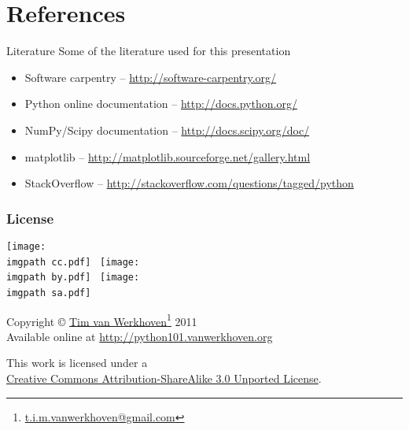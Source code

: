 \documentclass[xetex,10pt]{beamer}
\def\imgpath{../00-img/}
\def\spacer{\vspace*{1em}}
\begin{document}
\section*{References}

\begin{frame}{Literature}
	Some of the literature used for this presentation
	\spacer
	\begin{itemize}
		\item Software carpentry -- \url{http://software-carpentry.org/}
		\item Python online documentation -- \url{http://docs.python.org/}
		\pause
		\item NumPy/Scipy documentation -- \url{http://docs.scipy.org/doc/}
		\item matplotlib -- \url{http://matplotlib.sourceforge.net/gallery.html}
		\pause
		\item StackOverflow -- \url{http://stackoverflow.com/questions/tagged/python}
	\end{itemize}
	
\end{frame}

\begin{frame}
	\frametitle{License}

	\begin{center}
	\texttt{[image: \\imgpath cc.pdf]}~
	\texttt{[image: \\imgpath by.pdf]}~
	\texttt{[image: \\imgpath sa.pdf]}~
	
	\spacer

	Copyright © \href{http://work.vanwerkhoven.org/}{Tim van Werkhoven}\footnote[frame]{\url{t.i.m.vanwerkhoven@gmail.com}} 2011\\
	Available online at \url{http://python101.vanwerkhoven.org}
	
	\spacer

	This work is licensed under a\\
	\href{http://creativecommons.org/licenses/by-sa/3.0/}{Creative Commons Attribution-ShareAlike 3.0 Unported License}.

	\end{center}
	
\end{frame}
\end{document}

